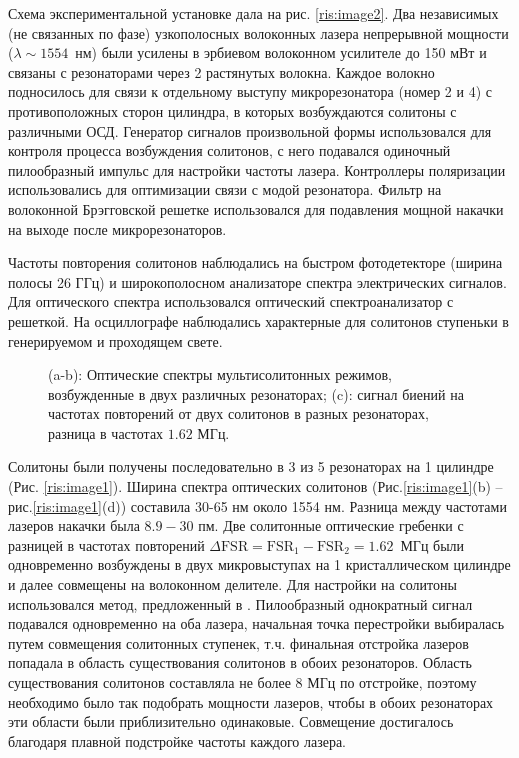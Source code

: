 Схема экспериментальной установке дала на рис. \ref{ris:image2}.  Два независимых (не связанных по фазе) узкополосных волоконных лазера непрерывной мощности ($\lambda \sim 1554$~нм) были усилены в эрбиевом волоконном усилителе до 150 мВт и связаны с резонаторами через 2 растянутых волокна. Каждое волокно подносилось для связи к отдельному выступу микрорезонатора (номер 2 и 4) с противоположных сторон цилиндра, в которых возбуждаются солитоны с различными ОСД. Генератор сигналов произвольной формы использовался для контроля процесса возбуждения солитонов, с него подавался одиночный пилообразный импульс для настройки частоты лазера. Контроллеры поляризации использовались для оптимизации связи с модой резонатора. Фильтр на волоконной Брэгговской решетке использовался для подавления мощной накачки на выходе после микрорезонаторов.

Частоты повторения солитонов наблюдались на быстром фотодетекторе (ширина полосы 26 ГГц) и широкополосном анализаторе спектра электрических сигналов. Для  оптического спектра использовался оптический спектроанализатор с решеткой. На осциллографе наблюдались характерные для солитонов ступеньки в генерируемом и проходящем свете.

\begin{figure}[ht]
\begin{minipage}[ht]{1\linewidth}
\end{minipage}
\caption{(a-b): Оптические спектры мультисолитонных режимов, возбужденные в двух различных резонаторах; (c): сигнал биений на частотах повторений от двух солитонов в разных резонаторах, разница в частотах $1.62$ МГц.}
\label{ris:image3}
\end{figure}

Солитоны были получены последовательно в 3 из 5 резонаторах на 1 цилиндре (Рис. \ref{ris:image1}). Ширина спектра оптических солитонов (Рис.\ref{ris:image1}(b) -- рис.\ref{ris:image1}(d)) составила 30-65 нм около 1554 нм. Разница между частотами лазеров накачки была $8.9-30$ пм. Две солитонные оптические гребенки с разницей в частотах повторений $\Delta\mbox{FSR} = \mbox{FSR}_1 - \mbox{FSR}_2 = 1.62$~МГц были одновременно возбуждены в двух микровыступах на 1 кристаллическом цилиндре и далее совмещены на волоконном делителе. Для настройки на солитоны использовался метод, предложенный в \cite{Herr2014}. Пилообразный однократный сигнал подавался одновременно на оба лазера, начальная точка перестройки выбиралась путем совмещения солитонных ступенек, т.ч. финальная отстройка лазеров попадала в область существования солитонов в обоих резонаторов. Область существования солитонов составляла не более 8 МГц по отстройке, поэтому необходимо было так подобрать мощности лазеров, чтобы в обоих резонаторах эти области были приблизительно одинаковые. Совмещение достигалось благодаря плавной подстройке частоты каждого лазера.

